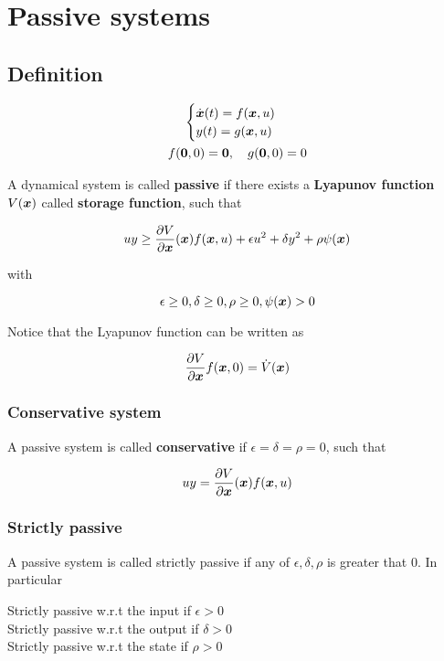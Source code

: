 \chapter{Passive systems}

\section{Definition}

\begin{gather*}
    \begin{cases}
        \dot{\boldsymbol{x}} (t) = f(\boldsymbol{x},u) \\
        y(t) = g(\boldsymbol{x},u)
    \end{cases} \\
    f(\boldsymbol{0},0) = \boldsymbol{0}, \quad g(\boldsymbol{0},0)=0
\end{gather*}

A dynamical system is called \textbf{passive} if there exists a \textbf{Lyapunov function} $V(\boldsymbol{x})$ called \textbf{storage function}, such that

\[
    uy \geq \frac{\partial V}{\partial \boldsymbol{x}}(\boldsymbol{x}) f(\boldsymbol{x},u) + \epsilon u^2 + \delta y^2 + \rho \psi(\boldsymbol{x})
\]

with

\[
    \epsilon \geq 0, \delta \geq 0, \rho \geq 0, \psi(\boldsymbol{x}) > 0
\]

Notice that the Lyapunov function can be written as

\[
     \frac{\partial V}{\partial \boldsymbol{x}} f(\boldsymbol{x},0) = \dot{V}(\boldsymbol{x})
\]

\subsection{Conservative system}

A passive system is called \textbf{conservative} if $\epsilon = \delta = \rho = 0$, such that

\[
    uy = \frac{\partial V}{\partial \boldsymbol{x}}(\boldsymbol{x}) f(\boldsymbol{x},u)
\]

\subsection{Strictly passive}

A passive system is called strictly passive if any of $\epsilon, \delta, \rho$ is greater that $0$.
In particular

Strictly passive w.r.t the input if $\epsilon > 0$ \\
Strictly passive w.r.t the output if $\delta > 0$ \\
Strictly passive w.r.t the state if $\rho > 0$

